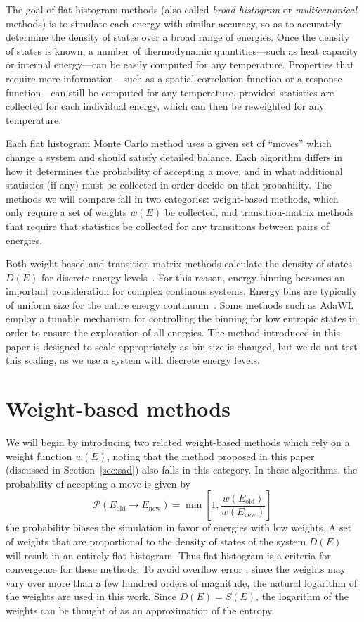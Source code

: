 \documentclass[letterpaper,twocolumn,amsmath,amssymb,pre,aps,10pt]{revtex4-1}
\begin{document}
The goal of flat histogram methods (also called \emph{broad histogram}
or \emph{multicanonical} methods) is to simulate each energy with
similar accuracy, so as to accurately determine the density of states
over a broad range of energies.  Once the density of states is known,
a number of thermodynamic quantities---such as heat capacity or
internal energy---can be easily computed for any temperature.
Properties that require more information---such as a spatial
correlation function or a response function---can still be computed
for any temperature, provided statistics are collected for each
individual energy, which can then be reweighted for any temperature.

Each flat histogram Monte Carlo method uses a given set of ``moves''
which change a system and should satisfy detailed balance.  Each
algorithm differs in how it determines the probability of accepting a
move, and in what additional statistics (if any) must be collected in
order decide on that probability.  The methods we will compare fall in
two categories:  weight-based methods, which only require a set of
weights $w(E)$ be collected, and transition-matrix methods that
require that statistics be collected for any transitions between pairs
of energies.

Both weight-based and transition matrix methods calculate
the density of states $D(E)$ for discrete energy
levels~\cite{haber2018performance}. For this reason, energy binning
becomes an important consideration for complex continous systems.
Energy bins are typically of uniform size for the entire energy
continuum~\cite{fasnacht2004adaptive}. Some methods such as
AdaWL~\cite{koh2013dynamically}
employ a tunable mechanism for controlling the binning for low entropic
states in order to ensure the exploration of all energies.  The method
introduced in this paper is designed to scale appropriately as bin size
is changed, but we do not test this scaling, as we use a system with
discrete energy levels.

\section{Weight-based methods}\label{sec:weight}

We will begin by introducing two related weight-based methods which
rely on a weight function $w(E)$, noting that the method proposed in
this paper (discussed in Section~\ref{sec:sad}) also falls in this
category.  In these algorithms, the probability of accepting a move is
given by
\begin{equation}
	\mathcal{P}(E_\text{old} \rightarrow E_\text{new})
	= \min\left[1,\frac{w(E_\text{old})}{w(E_\text{new})}\right]
\end{equation}
the probability biases the simulation in favor of energies with low weights.
A set of weights that are proportional to the density of states of the
system $D(E)$ will result in an entirely flat histogram.  Thus
flat histogram is a criteria for convergence for these methods.  To avoid
overflow error , since the weights may vary over more than a
few hundred orders of magnitude, the natural logarithm of the weights are used
in this work.  Since $D(E) = S(E)$, the logarithm of the weights
can be thought of as an approximation of the entropy.
\end{document}
